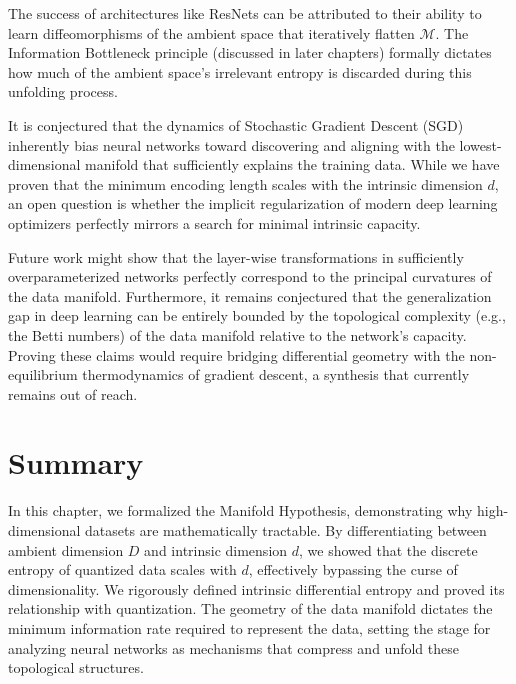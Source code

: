 The success of architectures like ResNets can be attributed to their ability to learn diffeomorphisms of the ambient space that iteratively flatten $\mathcal{M}$. The Information Bottleneck principle (discussed in later chapters) formally dictates how much of the ambient space's irrelevant entropy is discarded during this unfolding process.

\begin{horizon}
It is conjectured that the dynamics of Stochastic Gradient Descent (SGD) inherently bias neural networks toward discovering and aligning with the lowest-dimensional manifold that sufficiently explains the training data. While we have proven that the minimum encoding length scales with the intrinsic dimension $d$, an open question is whether the implicit regularization of modern deep learning optimizers perfectly mirrors a search for minimal intrinsic capacity.

Future work might show that the layer-wise transformations in sufficiently overparameterized networks perfectly correspond to the principal curvatures of the data manifold. Furthermore, it remains conjectured that the generalization gap in deep learning can be entirely bounded by the topological complexity (e.g., the Betti numbers) of the data manifold relative to the network's capacity. Proving these claims would require bridging differential geometry with the non-equilibrium thermodynamics of gradient descent, a synthesis that currently remains out of reach.
\end{horizon}

\section{Summary}
In this chapter, we formalized the Manifold Hypothesis, demonstrating why high-dimensional datasets are mathematically tractable. By differentiating between ambient dimension $D$ and intrinsic dimension $d$, we showed that the discrete entropy of quantized data scales with $d$, effectively bypassing the curse of dimensionality. We rigorously defined intrinsic differential entropy and proved its relationship with quantization. The geometry of the data manifold dictates the minimum information rate required to represent the data, setting the stage for analyzing neural networks as mechanisms that compress and unfold these topological structures.

